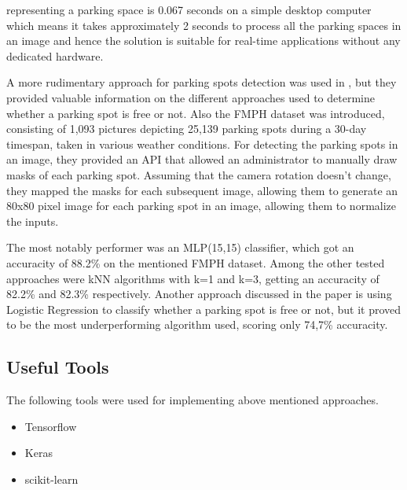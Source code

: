 \documentclass[12pt]{article}
\begin{document}
representing a parking space is 0.067 seconds on a simple desktop computer 
which means it takes approximately 2 seconds to process all the parking 
spaces in an image and hence the solution is suitable for real-time 
applications without any dedicated hardware.
\par
A more rudimentary approach for parking spots detection was used in \cite{roman},
but they provided valuable information on the different approaches used
to determine whether a parking spot is free or not. Also the FMPH dataset
was introduced, consisting of 1,093 pictures depicting 25,139 parking
spots during a 30-day timespan, taken in various weather conditions.
For detecting the parking spots in an image, they provided an API that
allowed an administrator to manually draw masks of each parking spot.
Assuming that the camera rotation doesn't change, they mapped the masks
for each subsequent image, allowing them to generate an 80x80 pixel
image for each parking spot in an image, allowing them to normalize
the inputs.
\par
The most notably performer was an MLP(15,15) classifier, which got an accuracity
of 88.2\% on the mentioned FMPH dataset. Among the other tested approaches
were kNN algorithms with k=1 and k=3, getting an accuracity of 82.2\% and
82.3\% respectively. Another approach discussed in the paper is using
Logistic Regression to classify whether a parking spot is free or not,
but it proved to be the most underperforming algorithm used, scoring
only 74,7\% accuracity.

\subsection{Useful Tools}

The following tools were used for implementing above mentioned approaches.
\begin{itemize}
  \item Tensorflow
  \item Keras
  \item scikit-learn
\end{itemize}
\end{document}
